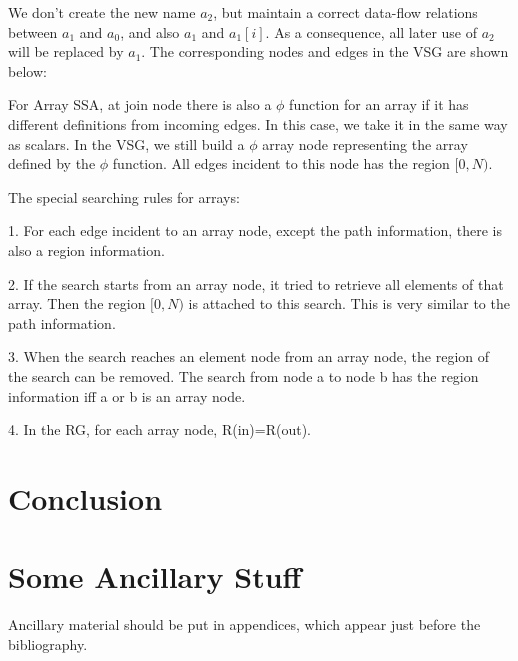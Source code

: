 \documentclass[12pt]{gatech-thesis}
\begin{document}
We don't create the new name $a_2$, but maintain a correct data-flow relations between $a_1$ and $a_0$, and also $a_1$ and $a_1[i]$. 
As a consequence, all later use of $a_2$ will be replaced by $a_1$.
The corresponding nodes and edges in the VSG are shown below:




For Array SSA, at join node there is also a $\phi$ function for an array if it has different definitions from incoming edges. In this case, we take it in the same way as scalars. In the VSG, we still build a $\phi$ array node representing the array defined by the $\phi$ function. All edges incident to this node has the region $[0,N)$. 

The special searching rules for arrays:

1. For each edge incident to an array node, except the path information, there is also a region information. 

2.  If the search starts from an array node, it tried to retrieve all elements of that array. Then the region $[0,N)$ is attached to this search. This is very similar to the path information. 

3. When the search reaches an element node from an array node, the region of the search can be removed. The search from node a to node b has the region information iff a or b is an array node.

4. In the RG, for each array node, R(in)=R(out).





\chapter{Conclusion}

\nocite{*}
\appendix
\chapter{Some Ancillary Stuff}

Ancillary material should be put in appendices, which 
appear just before the bibliography. 
\end{document}
